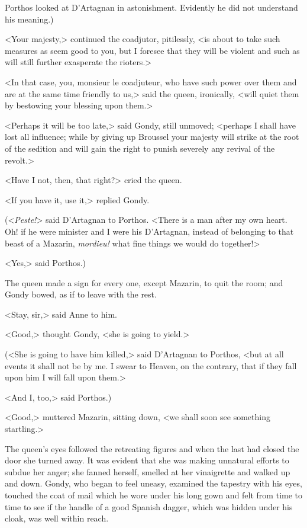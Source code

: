 Porthos looked at D'Artagnan in astonishment. Evidently he did not understand his meaning.)

<Your majesty,> continued the coadjutor, pitilessly, <is about to take such measures as seem good to you, but I foresee that they will be violent and such as will still further exasperate the rioters.>

<In that case, you, monsieur le coadjuteur, who have such power over them and are at the same time friendly to us,> said the queen, ironically, <will quiet them by bestowing your blessing upon them.>

<Perhaps it will be too late,> said Gondy, still unmoved; <perhaps I shall have lost all influence; while by giving up Broussel your majesty will strike at the root of the sedition and will gain the right to punish severely any revival of the revolt.>

<Have I not, then, that right?> cried the queen.

<If you have it, use it,> replied Gondy.

(<\textit{Peste!}> said D'Artagnan to Porthos. <There is a man after my own heart. Oh! if he were minister and I were his D'Artagnan, instead of belonging to that beast of a Mazarin, \textit{mordieu!} what fine things we would do together!>

<Yes,> said Porthos.)

The queen made a sign for every one, except Mazarin, to quit the room; and Gondy bowed, as if to leave with the rest.

<Stay, sir,> said Anne to him.

<Good,> thought Gondy, <she is going to yield.>

(<She is going to have him killed,> said D'Artagnan to Porthos, <but at all events it shall not be by me. I swear to Heaven, on the contrary, that if they fall upon him I will fall upon them.>

<And I, too,> said Porthos.)

<Good,> muttered Mazarin, sitting down, <we shall soon see something startling.>

The queen's eyes followed the retreating figures and when the last had closed the door she turned away. It was evident that she was making unnatural efforts to subdue her anger; she fanned herself, smelled at her vinaigrette and walked up and down. Gondy, who began to feel uneasy, examined the tapestry with his eyes, touched the coat of mail which he wore under his long gown and felt from time to time to see if the handle of a good Spanish dagger, which was hidden under his cloak, was well within reach.

